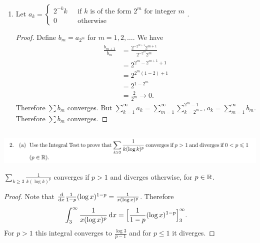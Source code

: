 \documentclass[12pt]{article}
\begin{document}
\begin{enumerate}[label=(\alph*)]
\item
  \begin{claim*}
    Let $a_k =
    \begin{cases}
      2^{-k}k ~~~ &\text{if $k$ is of the form $2^m$ for integer $m$}\\
      0      ~~~ &\text{otherwise}
    \end{cases}$.
  \end{claim*}

  \begin{proof}
    Define $b_m = a_{2^m}$ for $m = 1, 2, \ldots$. We have
    \begin{align*}
      \frac{b_{m+1}}{b_m}
      &= \frac{2^{-2^{m+1}}2^{m+1}}
              {2^{-2^m}2^m}\\
      &= 2^{2^m-2^{m+1} + 1}\\
      &= 2^{2^m(1 - 2) + 1}\\
      &= 2^{1 - 2^m}\\
      &= \frac{2}{2^m} \to 0.
    \end{align*}
    Therefore $\sum b_m$ converges. But
    $\sum_{k=1}^\infty a_k = \sum_{m=1}^\infty \sum_{k=2^{m-1}}^{2^m - 1} a_k = \sum_{m=1}^\infty
    b_m$. Therefore $\sum b_m$ converges.
  \end{proof}
\end{enumerate}


\newpage
\subsection{}
\begin{mdframed}
\includegraphics[width=400pt]{img/analysis--oxford-M2-I-6-2.png}
\end{mdframed}

\begin{claim*}
  $\sum_{k\geq3} \frac{1}{k(\log k)^p}$ converges if $p > 1$ and diverges otherwise, for
  $p \in \mathbb{R}$.
\end{claim*}

\begin{proof}
  Note that $\ddx \frac{1}{1 - p}(\log x)^{1 - p} = \frac{1}{x(\log x)^p}$. Therefore
  \begin{align*}
    \int_3^\infty \frac{1}{x(\log x)^p} \dx
    & = \Big[\frac{1}{1 - p}(\log x)^{1 - p}\Big]_3^\infty.
  \end{align*}
  For $p > 1$ this integral converges to $\frac{\log 3}{p - 1}$ and for $p \leq 1$ it diverges.
\end{proof}
\end{document}
